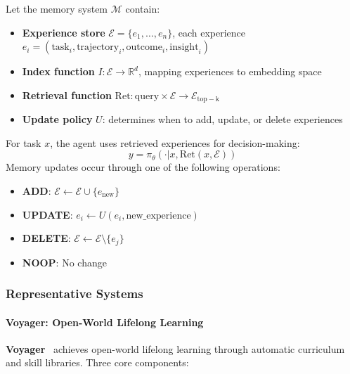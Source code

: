 \begin{definition}
Let the memory system $\mathcal{M}$ contain:
\begin{itemize}
\item \textbf{Experience store} $\mathcal{E} = \{e_1, \ldots, e_n\}$, each experience $e_i = (\text{task}_i, \text{trajectory}_i, \text{outcome}_i, \text{insight}_i)$
\item \textbf{Index function} $I: \mathcal{E} \rightarrow \mathbb{R}^d$, mapping experiences to embedding space
\item \textbf{Retrieval function} $\text{Ret}: \text{query} \times \mathcal{E} \rightarrow \mathcal{E}_{\mathrm{top-k}}$
\item \textbf{Update policy} $U$: determines when to add, update, or delete experiences
\end{itemize}
For task $x$, the agent uses retrieved experiences for decision-making:
\begin{equation}
y = \pi_\theta(\cdot | x, \text{Ret}(x, \mathcal{E}))
\label{eq:memory-retrieval}
\end{equation}
Memory updates occur through one of the following operations:
\begin{itemize}
\item \textbf{ADD}: $\mathcal{E} \leftarrow \mathcal{E} \cup \{e_{\mathrm{new}}\}$
\item \textbf{UPDATE}: $e_i \leftarrow U(e_i, \text{new\_experience})$
\item \textbf{DELETE}: $\mathcal{E} \leftarrow \mathcal{E} \setminus \{e_j\}$
\item \textbf{NOOP}: No change
\end{itemize}
\end{definition}

\subsubsection{Representative Systems}

\paragraph{Voyager: Open-World Lifelong Learning}

\textbf{Voyager}~\citep{voyager2023} achieves open-world lifelong learning through automatic curriculum and skill libraries. Three core components:

